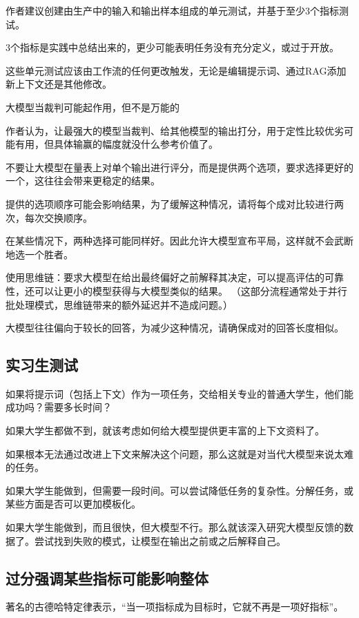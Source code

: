 \documentclass[12pt]{book}
\begin{document}
作者建议创建由生产中的输入和输出样本组成的单元测试，并基于至少3个指标测试。

3个指标是实践中总结出来的，更少可能表明任务没有充分定义，或过于开放。

这些单元测试应该由工作流的任何更改触发，无论是编辑提示词、通过RAG添加新上下文还是其他修改。

大模型当裁判可能起作用，但不是万能的

作者认为，让最强大的模型当裁判、给其他模型的输出打分，用于定性比较优劣可能有用，但具体输赢的幅度就没什么参考价值了。

不要让大模型在量表上对单个输出进行评分，而是提供两个选项，要求选择更好的一个，这往往会带来更稳定的结果。

提供的选项顺序可能会影响结果，为了缓解这种情况，请将每个成对比较进行两次，每次交换顺序。

在某些情况下，两种选择可能同样好。因此允许大模型宣布平局，这样就不会武断地选一个胜者。

使用思维链：要求大模型在给出最终偏好之前解释其决定，可以提高评估的可靠性，还可以让更小的模型获得与大模型类似的结果。
（这部分流程通常处于并行批处理模式，思维链带来的额外延迟并不造成问题。）

大模型往往偏向于较长的回答，为减少这种情况，请确保成对的回答长度相似。


\subsection{实习生测试}

如果将提示词（包括上下文）作为一项任务，交给相关专业的普通大学生，他们能成功吗？需要多长时间？

如果大学生都做不到，就该考虑如何给大模型提供更丰富的上下文资料了。

如果根本无法通过改进上下文来解决这个问题，那么这就是对当代大模型来说太难的任务。

如果大学生能做到，但需要一段时间。可以尝试降低任务的复杂性。分解任务，或某些方面是否可以更加模板化。

如果大学生能做到，而且很快，但大模型不行。那么就该深入研究大模型反馈的数据了。尝试找到失败的模式，让模型在输出之前或之后解释自己。



\subsection{过分强调某些指标可能影响整体}

著名的古德哈特定律表示，“当一项指标成为目标时，它就不再是一项好指标”。
\end{document}
